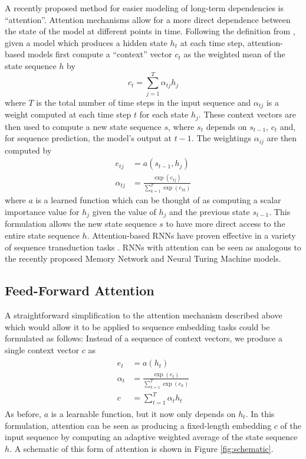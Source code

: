 \documentclass{article} %
\begin{document}
A recently proposed method for easier modeling of long-term dependencies is ``attention''.
Attention mechanisms allow for a more direct dependence between the state of the model at different points in time.
Following the definition from \cite{bahdanau2014neural}, given a model which produces a hidden state $h_t$ at each time step, attention-based models first compute a ``context'' vector $c_t$ as the weighted mean of the state sequence $h$ by
$$
c_t = \sum_{j = 1}^T \alpha_{tj} h_j
$$
where $T$ is the total number of time steps in the input sequence and $\alpha_{tj}$ is a weight computed at each time step $t$ for each state $h_j$.
These context vectors are then used to compute a new state sequence $s$, where $s_t$ depends on $s_{t - 1}$, $c_t$ and, for sequence prediction, the model's output at $t - 1$.
The weightings $\alpha_{ij}$ are then computed by
\begin{align*}
e_{tj} &= a(s_{t - 1}, h_j)\\
\alpha_{tj} &= \frac{\exp(e_{tj})}{\sum_{k = 1}^T \exp(e_{tk})}
\end{align*}
where $a$ is a learned function which can be thought of as computing a scalar importance value for $h_j$ given the value of $h_j$ and the previous state $s_{t - 1}$.
This formulation allows the new state sequence $s$ to have more direct access to the entire state sequence $h$.
Attention-based RNNs have proven effective in a variety of sequence transduction tasks \cite{bahdanau2014neural,cho2015describing}.
RNNs with attention can be seen as analogous to the recently proposed Memory Network \cite{weston2014memory,sukhbaatar2015end} and Neural Turing Machine \cite{graves2014neural} models.

\subsection{Feed-Forward Attention}

A straightforward simplification to the attention mechanism described above which would allow it to be applied to sequence embedding tasks could be formulated as follows:
Instead of a sequence of context vectors, we produce a single context vector $c$ as
\begin{align}
\begin{split}
\label{eq:ffattention}
e_t &= a(h_t)\\
\alpha_t &= \frac{\exp(e_t)}{\sum_{k = 1}^T \exp(e_k)}\\
c &= \sum_{t = 1}^T \alpha_t h_t
\end{split}
\end{align}
As before, $a$ is a learnable function, but it now only depends on $h_t$.
In this formulation, attention can be seen as producing a fixed-length embedding $c$ of the input sequence by computing an adaptive weighted average of the state sequence $h$.  A schematic of this form of attention is shown in Figure \ref{fig:schematic}.
\end{document}
